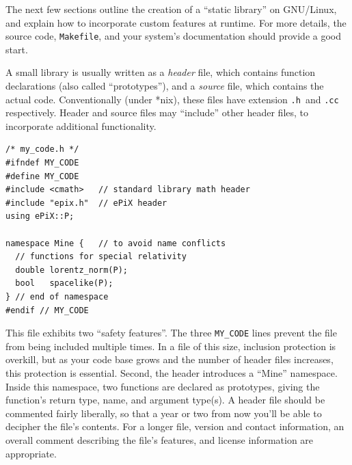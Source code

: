 \documentclass[12pt]{report}
\newcommand{\code}[1]{\texttt{#1}}
\newcommand{\filename}[1]{\texttt{#1}}
\begin{document}
The next few sections outline the creation of a ``static library'' on
GNU/Linux, and explain how to incorporate custom features at runtime.
For more details, the source code, \filename{Makefile}, and your
system's documentation should provide a good start.

A small library is usually written as a \emph{header} file, which
contains function declarations (also called ``prototypes''), and a
\emph{source} file, which contains the actual code. Conventionally
(under *nix), these files have extension \filename{.h}~and \filename{.cc}
respectively. Header and source files may ``include'' other header
files, to incorporate additional functionality.
\begin{verbatim}
/* my_code.h */
#ifndef MY_CODE
#define MY_CODE
#include <cmath>   // standard library math header
#include "epix.h"  // ePiX header
using ePiX::P;

namespace Mine {   // to avoid name conflicts
  // functions for special relativity
  double lorentz_norm(P);
  bool   spacelike(P);
} // end of namespace
#endif // MY_CODE
\end{verbatim}
This file exhibits two ``safety features''. The three \code{MY\_CODE}
lines prevent the file from being included multiple times. In a file
of this size, inclusion protection is overkill, but as your code base
grows and the number of header files increases, this protection is
essential. Second, the header introduces a ``Mine'' namespace. Inside
this namespace, two functions are declared as prototypes, giving the
function's return type, name, and argument type(s). A header file
should be commented fairly liberally, so that a year or two from now
you'll be able to decipher the file's contents.  For a longer file,
version and contact information, an overall comment describing the
file's features, and license information are appropriate.
\end{document}
